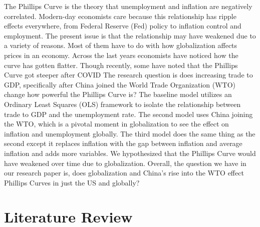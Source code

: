 \documentclass{article}
\begin{document}
The Phillips Curve is the theory that unemployment and inflation are negatively correlated\autocite{investopedia_phillips}. Modern-day economists care because this relationship has ripple effects everywhere, from Federal Reserve (Fed) policy to inflation control and employment. The present issue is that the relationship may have weakened due to a variety of reasons\autocite{BOC}. Most of them have to do with how globalization affects prices in an economy. Across the last years economists have noticed how the curve has gotten flatter\autocite{Cleveland-fed}. Though recently, some have noted that the Phillips Curve got steeper after COVID\autocite{Chicago-fed} The research question is does increasing trade to GDP, specifically after China joined the World Trade Organization (WTO)\autocite{cfr2021} change how powerful the Phillips Curve is? The baseline model utilizes an Ordinary Least Squares (OLS) framework to isolate the relationship between trade to GDP and the unemployment rate. The second model uses China joining the WTO, which is a pivotal moment in globalization to see the effect on inflation and unemployment globally. The third model does the same thing as the second except it replaces inflation with the gap between inflation and average inflation and adds more variables. We hypothesized that the Phillips Curve would have weakened over time due to globalization. Overall, the question we have in our research paper is, does globalization and China's rise into the WTO effect Phillips Curves in just the US and globally? 

\section{Literature Review}
\end{document}
